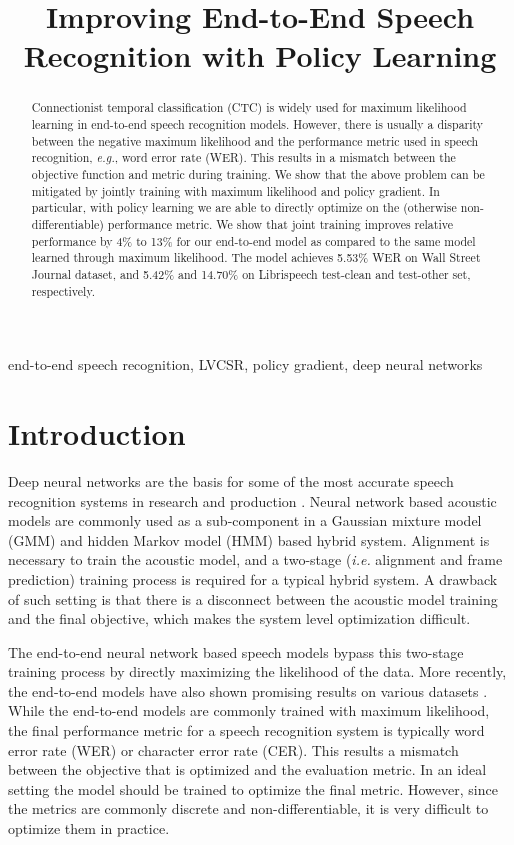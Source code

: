 \documentclass{article}
\title{Improving End-to-End Speech Recognition with Policy Learning}
\newcommand{\ie}{\emph{i.e.}\xspace}
\newcommand{\eg}{\emph{e.g.}\xspace}
\begin{document}
\maketitle
\begin{abstract}
Connectionist temporal classification (CTC) is widely used for maximum likelihood learning in end-to-end speech recognition models. However, there is usually a disparity between the negative maximum likelihood and the performance metric used in speech recognition, \eg, word error rate (WER). This results in a mismatch between the objective function and metric during training. We show that the above problem can be mitigated by jointly training with maximum likelihood and policy gradient. In particular, with policy learning we are able to directly optimize on the (otherwise non-differentiable) performance metric. We show that joint training improves relative performance by 4\% to 13\% for our end-to-end model as compared to the same model learned through maximum likelihood. The model achieves 5.53\% WER on Wall Street Journal dataset, and 5.42\% and 14.70\% on Librispeech test-clean and test-other set, respectively.
\end{abstract}
\begin{keywords}
end-to-end speech recognition, LVCSR, policy gradient, deep neural networks
\end{keywords}
\section{Introduction}
\label{sec:intro}


Deep neural networks are the basis for some of the most accurate speech recognition systems in research and production \cite{hinton2012deep,saon2015ibm,xiong2017microsoft}. 
Neural network based acoustic models are commonly used as a sub-component in a Gaussian mixture model (GMM) and hidden Markov model (HMM) based hybrid system.
Alignment is necessary to train the acoustic model, and a two-stage (\ie alignment and frame prediction) training process is required for a typical hybrid system. A drawback of such setting is that there is a disconnect between the acoustic model training and the final objective, which makes the system level optimization difficult. 


The end-to-end neural network based speech models bypass this two-stage training process by directly maximizing the likelihood of the data. More recently, the end-to-end models have also shown promising results on various datasets \cite{graves2014towards,miao2015eesen,amodei2016deep,bahdanau2016end}. While the end-to-end models are commonly trained with maximum likelihood, the final performance metric for a speech recognition system is typically word error rate (WER) or character error rate (CER). This results a mismatch between the objective that is optimized and the evaluation metric. In an ideal setting the model should be trained to optimize the final metric. However, since the metrics are commonly discrete and non-differentiable, it is very difficult to optimize them in practice. 
\end{document}
